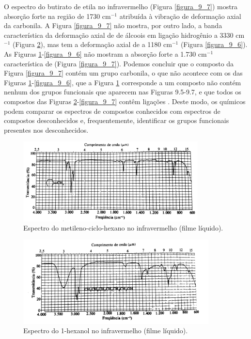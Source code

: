 O espectro do butirato de etila no infravermelho (Figura \ref{figura_9_7}) mostra absorção forte na região de 1730 cm$^{-1}$ atribuída à vibração de deformação axial da carbonila. A Figura \ref{figura_9_7} não mostra, por outro lado, a banda característica da deformação axial de  de álcoois em ligação hidrogênio a 3330 cm$^{-1}$ (Figura \ref{figura_9_5}), mas tem a deformação axial de  a 1180 cm$^{-1}$ (Figura \ref{figura_9_6}). As Figuras \ref{figura_9_4}-\ref{figura_9_6} não mostram a absorção forte a 1.730 cm$^{-1}$ característica de  (Figura \ref{figura_9_7}). Podemos concluir que o composto da Figura \ref{figura_9_7} contém um grupo carbonila, o que não acontece com os das Figuras \ref{figura_9_4}-\ref{figura_9_6}, que a Figura \ref{figura_9_4} corresponde a um composto não contém nenhum dos grupos funcionais que aparecem nas Figuras 9.5-9.7, e que todos os compostos das Figuras \ref{figura_9_5}-\ref{figura_9_7} contêm ligações . Deste modo, os químicos podem comparar os espectros de compostos conhecidos com espectros de compostos desconhecidos e, frequentemente, identificar os grupos funcionais presentes nos desconhecidos. 

\begin{figure}[H]
    \centering
    \includegraphics[width=0.85\textwidth,angle=0]{content/images/Figura_9_4.pdf}
    \caption{Espectro do metileno-ciclo-hexano no infravermelho (filme líquido).}
    \label{figura_9_4}
\end{figure}

\begin{figure}[H]
    \centering
    \includegraphics[width=0.9\textwidth,angle=0]{content/images/Figura_9_5.pdf}
    \caption{Espectro do 1-hexanol no infravermelho (filme líquido).}
    \label{figura_9_5}
\end{figure}

